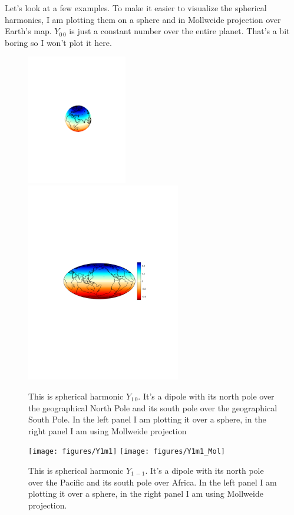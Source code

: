 \documentclass[11pt]{article}
\newcommand{\Yfun}{Y}
\begin{document}
Let's look at a few examples. To make it easier to visualize the
spherical harmonics, I am plotting them on a sphere and in Mollweide
projection over Earth's map. $\Yfun_{0\,0}$ is just a constant number
over the entire planet. That's a bit boring so I won't plot it here.

\begin{figure}%
\centering \includegraphics[width=0.39\textwidth,trim = 7cm 10cm 7cm
  10cm, clip]{figures/Fig1} \includegraphics[width=0.6\textwidth,trim =
  3cm 9cm 3cm 10cm, clip]{figures/Fig1bar}
\caption{This is spherical harmonic $\Yfun_{1\,0}$. It's a dipole with
  its north pole over the geographical North Pole and its south pole
  over the geographical South Pole. In the left panel I am plotting it
  over a sphere, in the right panel I am using Mollweide projection}
\label{Y10fig}
\end{figure}

\begin{figure}%
\centering \texttt{[image: figures/Y1m1]} \texttt{[image: figures/Y1m1\_Mol]}
\caption{This is spherical harmonic $\Yfun_{1\,-1}$. It's a dipole
  with its north pole over the Pacific and its south pole over
  Africa. In the left panel I am plotting it over a sphere, in the
  right panel I am using Mollweide projection.}
\label{Y1m1fig}
\end{figure}
 
\end{document}
